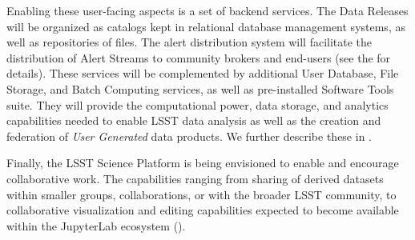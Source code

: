 Enabling these user-facing aspects is a set of backend services. The Data Releases will be organized as catalogs kept in relational database management systems, as well as repositories of files. The alert distribution system will facilitate the distribution of Alert Streams to community brokers and end-users (see the \DPDD for details). These services will be complemented by additional User Database, File Storage, and Batch Computing services, as well as pre-installed Software Tools suite. They will provide the computational power, data storage, and analytics capabilities needed to enable LSST data analysis as well as the creation and federation of \textit{User Generated} data products. We further describe these in .

Finally, the LSST Science Platform is being envisioned to enable and encourage
collaborative work.  The capabilities ranging from sharing of derived
datasets within smaller groups, collaborations, or with the broader LSST
community, to collaborative visualization and editing capabilities expected
to become available within the JupyterLab ecosystem ().